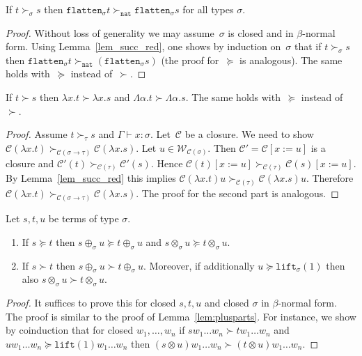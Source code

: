 \documentclass[runningheads,a4paper]{llncs}
\newcommand{\World}{\mathcal{W}}
\newcommand{\cl}{\mathcal{C}}
\newcommand{\arrtype}{\rightarrow}
\newcommand{\abs}[2]{\lambda #1.#2}
\newcommand{\tabs}[2]{\Lambda #1.#2}
\newcommand{\subst}[2]{#1:=#2}
\newcommand{\nat}{\mathtt{nat}}
\newcommand{\flatten}{\mathtt{flatten}}
\newcommand{\lift}{\mathtt{lift}}
\newcommand{\proves}{\vdash}
\begin{document}
\begin{lemma}\label{lem_flatten_succ}
  If $t \succ_\sigma s$ then $\flatten_\sigma t \succ_\nat
  \flatten_\sigma s$ for all types $\sigma$.
\end{lemma}

\begin{proof}
  Without loss of generality we may assume~$\sigma$ is closed and in
  $\beta$-normal form. Using Lemma~\ref{lem_succ_red}, one shows by
  induction on~$\sigma$ that if $t \succ_\sigma s$ then
  $\flatten_\sigma t \succ_\nat (\flatten_\sigma s)$ (the proof
  for~$\succeq$ is analogous). The same holds with~$\succeq$ instead
  of~$\succ$.
\end{proof}

\begin{lemma}\label{lem_abs_succ}
  If $t \succ s$ then $\abs{x}{t} \succ \abs{x}{s}$ and
  $\tabs{\alpha}{t} \succ \tabs{\alpha}{s}$. The same holds
  with~$\succeq$ instead of~$\succ$.
\end{lemma}

\begin{proof}
  Assume $t \succ_\tau s$ and $\Gamma \proves x : \sigma$. Let~$\cl$
  be a closure. We need to show $\cl(\abs{x}{t})
  \succ_{\cl(\sigma\arrtype\tau)} \cl(\abs{x}{s})$. Let $u \in
  \World_{\cl(\sigma)}$. Then $\cl' = \cl[\subst{x}{u}]$ is a closure
  and $\cl'(t) \succ_{\cl(\tau)} \cl'(s)$. Hence $\cl(t)[\subst{x}{u}]
  \succ_{\cl(\tau)} \cl(s)[\subst{x}{u}]$. By Lemma~\ref{lem_succ_red}
  this implies $\cl(\abs{x}{t}) u \succ_{\cl(\tau)} \cl(\abs{x}{s})
  u$. Therefore $\cl(\abs{x}{t}) \succ_{\cl(\sigma\arrtype\tau)}
  \cl(\abs{x}{s})$. The proof for the second part is analogous.
\end{proof}

\begin{lemma}\label{lem:plustimesmonotonic}
  Let $s,t,u$ be terms of type $\sigma$.
  \begin{enumerate}
  \item If $s \succeq t$ then $s \oplus_\sigma u \succeq t
    \oplus_\sigma u$ and $s \otimes_\sigma u \succeq t \otimes_\sigma
    u$.
  \item If $s \succ t$ then $s \oplus_\sigma u \succ t \oplus_\sigma
    u$. Moreover, if additionally $u \succeq \lift_\sigma(1)$ then
    also $s \otimes_\sigma u \succ t \otimes_\sigma u$.
  \end{enumerate}
\end{lemma}

\begin{proof}
  It suffices to prove this for closed $s,t,u$ and closed $\sigma$ in
  $\beta$-normal form. The proof is similar to the proof of
  Lemma~\ref{lem:plusparts}. For instance, we show by coinduction that
  for closed $w_1,\ldots,w_n$ if $s w_1 \ldots w_n \succ t w_1 \ldots
  w_n$ and $u w_1 \ldots w_n \succeq \lift(1) w_1 \ldots w_n$ then $(s
  \otimes u) w_1 \ldots w_n \succ (t \otimes u) w_1 \ldots w_n$.
\end{proof}
\end{document}
